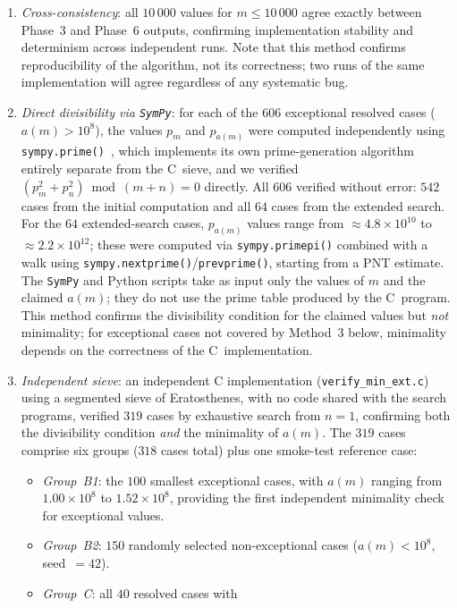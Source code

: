 \documentclass[pdflatex,sn-mathphys-num,Numbered]{sn-jnl}
\theoremstyle{thmstyleone}
\theoremstyle{thmstylethree}
\theoremstyle{thmstyletwo}
\numberwithin{equation}{section}
\begin{document}
\begin{enumerate}
	\item \emph{Cross-consistency}: all $10\,000$ values for
	$m \leq 10\,000$ agree exactly between Phase~3 and Phase~6 outputs,
	confirming implementation stability and determinism across
	independent runs.
	Note that this method confirms reproducibility of the algorithm,
	not its correctness; two runs of the same implementation will
	agree regardless of any systematic bug.
	\item \emph{Direct divisibility via \texttt{SymPy}}: for each of the
	$606$ exceptional resolved cases ($a(m) > 10^8$), the values $p_m$
	and $p_{a(m)}$ were computed independently using
	\texttt{sympy.prime()}~\cite{SymPy}, which implements its own
	prime-generation algorithm entirely separate from the C~sieve, and
	we verified $(p_m^2 + p_n^2) \bmod (m+n) = 0$ directly.
	All $606$ verified without error: $542$ cases from the initial
	computation and all $64$ cases from the extended search.
	For the $64$ extended-search cases, $p_{a(m)}$ values range from
	$\approx 4.8 \times 10^{10}$ to $\approx 2.2 \times 10^{12}$;
	these were computed via \texttt{sympy.primepi()} combined with a
	walk using \texttt{sympy.nextprime()}/\texttt{prevprime()}, starting
	from a PNT estimate.
	The \texttt{SymPy} and Python scripts take as input only the values
	of $m$ and the claimed $a(m)$; they do not use the prime table
	produced by the C~program.
	This method confirms the divisibility condition for the claimed
	values but \emph{not} minimality; for exceptional cases not covered
	by Method~3 below, minimality depends on the correctness of the
	C~implementation.
	\item \emph{Independent sieve}: an independent C implementation
	(\texttt{verify\_min\_ext.c}) using a segmented sieve of Eratosthenes,
	with no code shared with the search programs, verified $319$ cases
	by exhaustive search from $n = 1$, confirming both the divisibility
	condition \emph{and} the minimality of $a(m)$.
	The $319$ cases comprise six groups ($318$ cases total)
	plus one smoke-test reference case:
	\begin{itemize}
		\item \emph{Group~B1}: the $100$ smallest exceptional cases,
		with $a(m)$ ranging from $1.00 \times 10^8$ to
		$1.52 \times 10^8$, providing the first independent
		minimality check for exceptional values.
		\item \emph{Group~B2}: $150$ randomly selected non-exceptional
		cases ($a(m) < 10^8$, seed~$= 42$).
		\item \emph{Group~C}: all $40$ resolved cases with

\end{itemize}
\end{enumerate}
\end{document}
